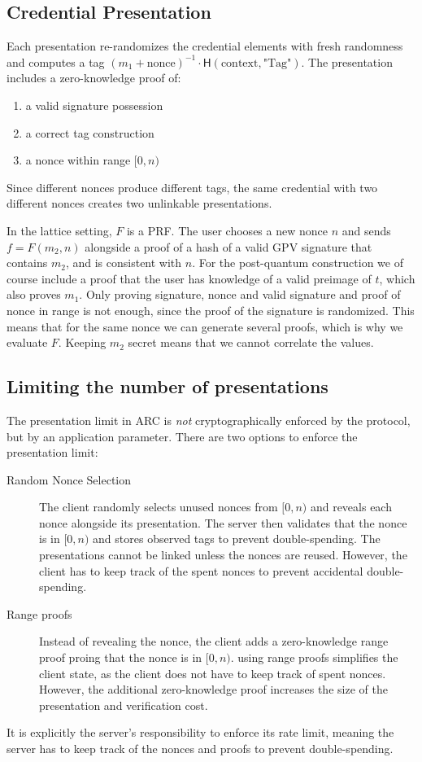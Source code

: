 \subsection{Credential Presentation}
Each presentation re-randomizes the credential elements with fresh randomness and computes a tag $(m_1 + \text{nonce})^{-1} \cdot \mathsf{H}(\text{context}, \text{"Tag"})$. The presentation includes a zero-knowledge proof of: 
    \begin{enumerate}
        \item a valid signature possession
        \item a correct tag construction
        \item a nonce within range $[0, n)$
    \end{enumerate}
    Since different nonces produce different tags, the same credential with two different nonces creates two unlinkable presentations. 

    In the lattice setting, $F$ is a PRF. The user chooses a new nonce $n$ and sends $f=F(m_2,n)$ alongside a proof of a hash of a valid GPV signature that contains $m_2$, and is consistent with $n$. 
    For the post-quantum construction we of course include a proof that the user has knowledge of a valid preimage of $t$, which also proves $m_1$. 
    Only proving signature, nonce and valid signature and proof of nonce in range is not enough, since the proof of the signature is randomized. This means that for the same nonce we can generate several proofs, which is why we evaluate $F$. Keeping $m_2$ secret means that we cannot correlate the values. 

\subsection{Limiting the number of presentations}
The presentation limit in ARC is \emph{not} cryptographically enforced by the protocol, but by an application parameter. There are two options to enforce the presentation limit:

\begin{description}
    \item[Random Nonce Selection] 
    The client randomly selects unused nonces from $[0, n)$ and reveals each nonce alongside its presentation. The server then validates that the nonce is in $[0,n)$ and stores observed tags to prevent double-spending. The presentations cannot be linked unless the nonces are reused. However, the client has to keep track of the spent nonces to prevent accidental double-spending. 
    \item[Range proofs] Instead of revealing the nonce, the client adds a zero-knowledge range proof proing that the nonce is in $[0, n)$. using range proofs simplifies the client state, as the client does not have to keep track of spent nonces. 
    However, the additional zero-knowledge proof increases the size of the presentation and verification cost.
\end{description}
It is explicitly the server's responsibility to enforce its rate limit, meaning the server has to keep track of the nonces and proofs to prevent double-spending. 

